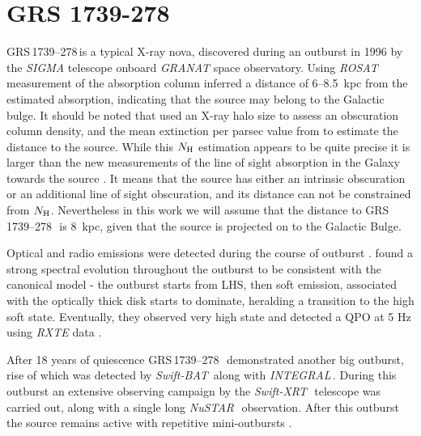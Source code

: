 \documentclass[a4paper,fleqn,usenatbib]{mnras}
\def\grs{{GRS\,1739--278\,}}
\def\swiftx{{\em Swift-XRT\,}}
\def\swiftb{{\em Swift-BAT\,}}
\def\nustar{{\em NuSTAR\,}}
\def\integral{{\em INTEGRAL\,}}
\begin{document}
\section{GRS 1739-278}

\grs is a typical X-ray nova, discovered during an outburst in 1996 \citep{paul96} by the {\it SIGMA} \citep{paul91} telescope onboard {\it GRANAT} space observatory.
Using {\it ROSAT} measurement of the absorption column \citet{greiner96} inferred a distance of 6--8.5~kpc from the estimated absorption, indicating that the source may belong to the Galactic bulge. 
It should be noted that \citet{greiner96} used an X-ray halo size to assess an obscuration column density, and the mean extinction per parsec value from \citet{1973asqu.book.....A} to estimate the distance to the source. 
While this $N_{\rm H}$ estimation appears to be quite precise it is larger than the new measurements of the line of sight absorption in the Galaxy towards the source \citep{1990ARA&A..28..215D, 2005A&A...440..775K, 2006A&A...453..635M, 2014A&A...566A.120S}. 
It means that the source has either an intrinsic obscuration or an additional line of sight obscuration,  and its distance can not be constrained from $N_{\rm H}$.
Nevertheless in this work we will assume that the distance to \grs\ is 8~kpc, given that the source is projected on to the Galactic Bulge.  

Optical and radio emissions were detected during the course of outburst \citep{hjellming96,marti97}. 
\citet{borozdin98} found a strong spectral evolution throughout the outburst to be consistent with the canonical model - the outburst starts from LHS, then soft emission, associated with the optically thick disk starts to dominate, heralding a transition to the high soft state. 
Eventually, they observed very high state and detected a QPO at 5 Hz using {\it RXTE} data \citep{borozdin00, 2001MNRAS.328..451W}.

After 18 years of quiescence \grs\ demonstrated another big outburst, rise of which was detected by \swiftb \citep{krimm14_atel} along with \integral \citep{filippova14}. 
During this outburst an extensive observing campaign by the \swiftx\, telescope was carried out, along with a single long \nustar\ observation. 
After this outburst the source remains active with repetitive mini-outbursts \citep{mereminskiy17grs,yan17}.
\end{document}
